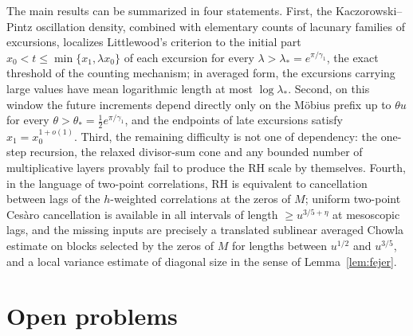 \documentclass[11pt]{amsart}
\numberwithin{equation}{section}
\theoremstyle{plain}
\theoremstyle{definition}
\theoremstyle{remark}
\begin{document}
The main results can be summarized in four statements. First, the
Kaczorowski--Pintz oscillation density, combined with elementary counts of
lacunary families of excursions, localizes Littlewood's criterion to the
initial part $x_0<t\le\min\{x_1,\lambda x_0\}$ of each excursion for every
$\lambda>\lambda_*=e^{\pi/\gamma_1}$, the exact threshold of the counting
mechanism; in averaged form, the excursions carrying large values have mean
logarithmic length at most $\log\lambda_*$. Second, on this window the
future increments depend directly only on the M\"obius prefix up to
$\theta u$ for every $\theta>\theta_*=\frac12e^{\pi/\gamma_1}$, and the
endpoints of late excursions satisfy $x_1=x_0^{1+o(1)}$. Third, the
remaining difficulty is not one of dependency: the one-step recursion, the
relaxed divisor-sum cone and any bounded number of multiplicative layers
provably fail to produce the RH scale by themselves. Fourth, in the language
of two-point correlations, RH is equivalent to cancellation between lags of
the $h$-weighted correlations at the zeros of $M$; uniform two-point
Ces\`aro cancellation is available in all intervals of length
$\ge u^{3/5+\eta}$ at mesoscopic lags, and the missing inputs are precisely a
translated sublinear averaged Chowla estimate on blocks selected by the
zeros of $M$ for lengths between $u^{1/2}$ and $u^{3/5}$, and a local
variance estimate of diagonal size in the sense of Lemma~\ref{lem:fejer}.

\section{Open problems}
\label{sec:open_questions}
\end{document}
